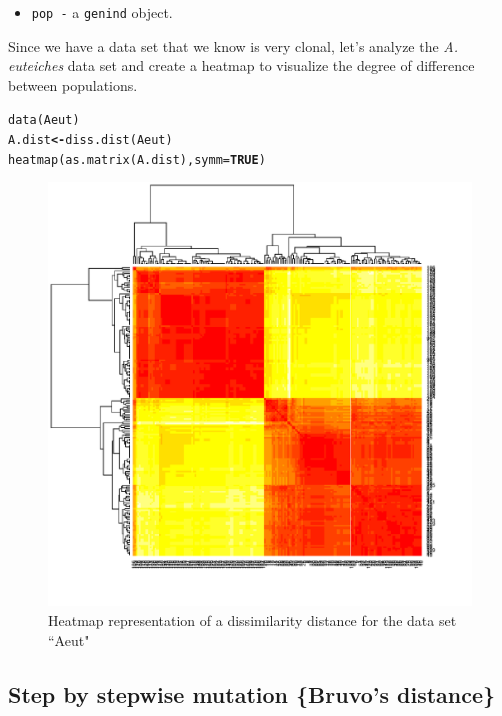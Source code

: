 \documentclass[letterpaper]{article}\usepackage[]{graphicx}\usepackage[]{color}
\makeatletter
\newcommand{\hlnum}[1]{\textcolor[rgb]{0.502,0,0.502}{\textbf{#1}}}%
\newcommand{\hlstd}[1]{\textcolor[rgb]{0,0,0}{#1}}%
\newcommand{\hlkwb}[1]{\textcolor[rgb]{0.502,0.502,0.753}{\textbf{#1}}}%
\newcommand{\hlkwc}[1]{\textcolor[rgb]{0,0.502,0.753}{#1}}%
\newcommand{\hlkwd}[1]{\textcolor[rgb]{0,0.267,0.4}{#1}}%
\newenvironment{kframe}{%
 \def\at@end@of@kframe{}%
 \ifinner\ifhmode%
  \def\at@end@of@kframe{\end{minipage}}%
  \begin{minipage}{\columnwidth}%
 \fi\fi%
 \def\FrameCommand##1{\hskip\@totalleftmargin \hskip-\fboxsep
 \colorbox{shadecolor}{##1}\hskip-\fboxsep
     \hskip-\linewidth \hskip-\@totalleftmargin \hskip\columnwidth}%
 \MakeFramed {\advance\hsize-\width
   \@totalleftmargin\z@ \linewidth\hsize
   \@setminipage}}%
 {\par\unskip\endMakeFramed%
 \at@end@of@kframe}
\newenvironment{knitrout}{}{} %
\makeatother
\begin{document}
\begin{itemize}
  \item \texttt{pop -} a \texttt{genind} object. 
\end{itemize}
Since we have a data set that we know is very clonal, let's analyze the \textit{A. euteiches} data set \cite{Grunwald:2006} and create a heatmap to visualize the degree of difference between populations.
\begin{knitrout}\footnotesize
{}\color{fgcolor}\begin{kframe}
\begin{alltt}
\hlkwd{data}\hlstd{(Aeut)}
\hlstd{A.dist} \hlkwb{<-} \hlkwd{diss.dist}\hlstd{(Aeut)}
\hlkwd{heatmap}\hlstd{(}\hlkwd{as.matrix}\hlstd{(A.dist),} \hlkwc{symm} \hlstd{=} \hlnum{TRUE}\hlstd{)}
\end{alltt}
\end{kframe}
\end{knitrout}

\begin{figure}[h!]
  \centering
  \caption{\footnotesize Heatmap representation of a dissimilarity distance for the data set ``Aeut"}
  \label{diss_heat_map}
\begin{knitrout}\footnotesize
{}\color{fgcolor}

{\centering \includegraphics[width=0.5\linewidth]{figure/unnamed-chunk-8} 

}



\end{knitrout}

\end{figure}
\newpage
\subsection{Step by stepwise mutation \{Bruvo's distance\}}\label{index:bruvo}
\end{document}
